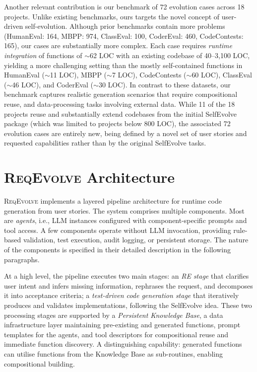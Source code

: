 \documentclass[sigconf,screen]{acmart}
\begin{document}
Another relevant contribution is our benchmark of 72 evolution cases across 18 projects. Unlike existing benchmarks, ours targets the novel concept of user-driven self-evolution. Although prior benchmarks contain more problems (HumanEval: 164, MBPP: 974, ClassEval: 100, CoderEval: 460, CodeContests: 165), our cases are substantially more complex. Each case requires \textit{runtime integration} of functions of ${\sim}$62 LOC with an existing codebase of 40--3,100 LOC, yielding a more challenging setting than the mostly self-contained functions in HumanEval (${\sim}$11 LOC), MBPP (${\sim}$7 LOC), CodeContests (${\sim}$60 LOC), ClassEval (${\sim}$46 LOC), and CoderEval (${\sim}$30 LOC). In contrast to these datasets, our benchmark captures realistic generation scenarios that require compositional reuse, and data-processing tasks involving external data.
While 11 of the 18 projects reuse and substantially extend codebases from the initial SelfEvolve package (which was limited to projects below 800 LOC), the associated 72 evolution cases are entirely new, being defined by a novel set of user stories and requested capabilities rather than by the original SelfEvolve tasks.

\section{\textsc{ReqEvolve} Architecture}\label{sec:architecture}

\textsc{ReqEvolve} implements a layered pipeline architecture for runtime code generation from user stories. The system comprises multiple components. Most are \textit{agents}, i.e., LLM instances configured with component-specific prompts and tool access. A few components operate without LLM invocation, providing rule-based validation, test execution, audit logging, or persistent storage. The nature of the components is specified in their detailed description in the following paragraphs.

At a high level, the pipeline executes two main stages: an \textit{RE stage} that clarifies user intent and infers missing information, rephrases the request, and decomposes it into acceptance criteria; a \textit{test-driven code generation stage} that iteratively produces and validates implementations, following the SelfEvolve idea. These two processing stages are supported by a \textit{Persistent Knowledge Base}, a data infrastructure layer maintaining pre-existing and generated functions, prompt templates for the agents, and tool descriptors for compositional reuse and immediate function discovery. A distinguishing capability: generated functions can utilise functions from the Knowledge Base as sub-routines, enabling compositional building.
\end{document}

